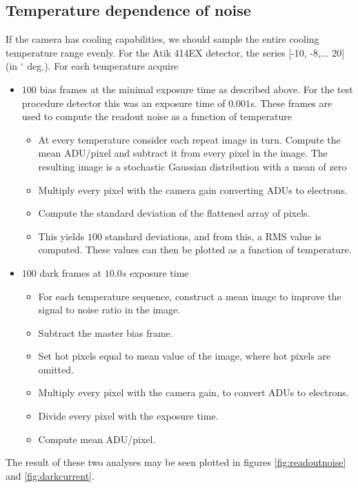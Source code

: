 \documentclass[../main.tex]{subfiles}
\begin{document}
		\subsection{Temperature dependence of noise}\label{sec:rondc}
		 If the camera has cooling capabilities, we should sample the entire cooling temperature range evenly. For the Atik 414EX detector, the series [-10, -8,$\dots$ 20] (in $^\circ$ deg.). For each temperature acquire
			\begin{itemize}
				\item $100$ bias frames at the minimal exposure time as described above. For the test procedure detector this was an exposure time of $0.001$s. These frames are used to compute the readout noise as a function of temperature
				\begin{itemize}
					\item At every temperature consider each repeat image in turn. Compute the mean ADU/pixel and subtract it from every pixel in the image. The resulting image is a stochastic Gaussian distribution with a mean of zero
					\item Multiply every pixel with the camera gain converting ADUs to electrons.
					\item Compute the standard deviation of the flattened array of pixels.
					\item This yields $100$ standard deviations, and from this, a RMS value is computed. These values can then be plotted as a function of temperature.
				\end{itemize} 
				\item $100$ dark frames at $10.0s$ exposure time
				\begin{itemize}
					\item For each temperature sequence, construct a mean image to improve the signal to noise ratio in the image.
					\item Subtract the master bias frame.
					\item Set hot pixels equal to mean value of the image, where hot pixels are omitted.
					\item Multiply every pixel with the camera gain, to convert ADUs to electrons.
					\item Divide every pixel with the exposure time.
					\item Compute mean ADU/pixel.
				\end{itemize}
			\end{itemize}
		The result of these two analyses may be seen plotted in figures \ref{fig:readoutnoise} and \ref{fig:darkcurrent}.
		
\end{document}
